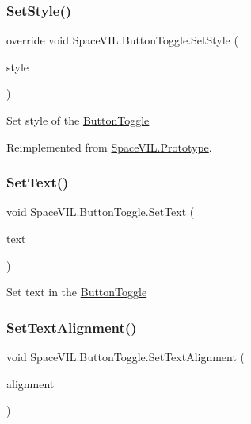 \subsubsection{\texorpdfstring{Set\+Style()}{SetStyle()}}
{\footnotesize\ttfamily override void Space\+V\+I\+L.\+Button\+Toggle.\+Set\+Style (\begin{DoxyParamCaption}\item[{\mbox{\hyperlink{class_space_v_i_l_1_1_decorations_1_1_style}{Style}}}]{style }\end{DoxyParamCaption})\hspace{0.3cm}{\ttfamily [virtual]}}



Set style of the \mbox{\hyperlink{class_space_v_i_l_1_1_button_toggle}{Button\+Toggle}} 



Reimplemented from \mbox{\hyperlink{class_space_v_i_l_1_1_prototype_ae96644a6ace490afb376fb542161e541}{Space\+V\+I\+L.\+Prototype}}.

\mbox{\label{class_space_v_i_l_1_1_button_toggle_ac931c391826bc511674985903c87149b}} 
\subsubsection{\texorpdfstring{Set\+Text()}{SetText()}}
{\footnotesize\ttfamily void Space\+V\+I\+L.\+Button\+Toggle.\+Set\+Text (\begin{DoxyParamCaption}\item[{String}]{text }\end{DoxyParamCaption})}



Set text in the \mbox{\hyperlink{class_space_v_i_l_1_1_button_toggle}{Button\+Toggle}} 

\mbox{\label{class_space_v_i_l_1_1_button_toggle_afdb8b34251a59d1268bdc23d91c4ee2b}} 
\subsubsection{\texorpdfstring{Set\+Text\+Alignment()}{SetTextAlignment()}}
{\footnotesize\ttfamily void Space\+V\+I\+L.\+Button\+Toggle.\+Set\+Text\+Alignment (\begin{DoxyParamCaption}\item[{Item\+Alignment}]{alignment }\end{DoxyParamCaption})}



